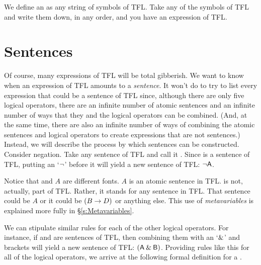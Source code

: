 We define an  as any string of symbols of TFL. Take any of the symbols of TFL and write them down, in any order, and you have an expression of TFL.


\section{Sentences}\label{s:Sentences}
Of course, many expressions of TFL will be total gibberish. We want to know when an expression of TFL amounts to a \emph{sentence}. It won't do to try to list every expression that could be a sentence of TFL since, although there are only five logical operators, there are an infinite number of atomic sentences and an infinite number of ways that they and the logical operators can be combined. (And, at the same time, there are also an infinite number of ways of combining the atomic sentences and logical operators to create expressions that are not sentences.)
Instead, we will describe the process by which sentences can be constructed. Consider negation. Take any sentence of TFL and call it . Since  is a sentence of TFL, putting an `${\neg}$' before it will yield a new sentence of TFL: ${\neg}\mathsf{A}$.

\begin{notebox}
Notice that  and $A$ are different fonts. $A$ is an atomic sentence in TFL.  is not, actually, part of TFL. Rather, it stands for any sentence in TFL. That sentence could be $A$ or it could be $(B \rightarrow D)$ or anything else. This use of \textit{metavariables} is explained more fully in \S\ref{s:Metavariables}.
\end{notebox}

We can stipulate similar rules for each of the other logical operators. For instance, if  and  are sentences of TFL, then combining them with an `$\mathbin{\&}$' and brackets will yield a new sentence of TFL: $(\mathsf{A}\mathbin{\&}\mathsf{B})$. Providing rules like this for all of the logical operators, we arrive at the following formal definition for a .

